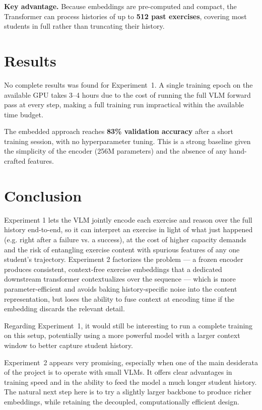 \documentclass[10pt]{article}
\begin{document}
\textbf{Key advantage.} Because embeddings are pre-computed and compact, the Transformer can process 
histories of up to \textbf{512 past exercises}, covering most students in full rather than truncating 
their history.

\section*{Results}

No complete results was found for Experiment~1. A single training epoch on the available GPU takes 3--4 
hours due to the cost of running the full VLM forward pass at every step, making a full training run 
impractical within the available time budget.

The embedded approach reaches \textbf{83\% validation accuracy} after a short training session, 
with no hyperparameter tuning. This is a strong baseline given the simplicity of the 
encoder (256M parameters) and the absence of any hand-crafted features.

\section*{Conclusion}

Experiment 1 lets the VLM jointly encode each exercise and reason over the full history 
end-to-end, so it can interpret an exercise in light of what just happened (e.g. right after 
a failure vs. a success), at the cost of higher capacity demands and the risk of entangling 
exercise content with spurious features of any one student's trajectory. Experiment 2 factorizes 
the problem — a frozen encoder produces consistent, context-free exercise embeddings that a 
dedicated downstream transformer contextualizes over the sequence — which is more parameter-efficient
and avoids baking history-specific noise into the content representation, but loses the ability 
to fuse context at encoding time if the embedding discards the relevant detail.

Regarding Experiment~1, it would still be interesting to run a complete training on this
setup, potentially using a more powerful model with a larger context window to better
capture student history.

Experiment~2 appears very promising, especially when one of the main desiderata of the
project is to operate with small VLMs. It offers clear advantages in training speed and
in the ability to feed the model a much longer student history. The natural next step
here is to try a slightly larger backbone to produce richer embeddings, while retaining
the decoupled, computationally efficient design.
\end{document}

